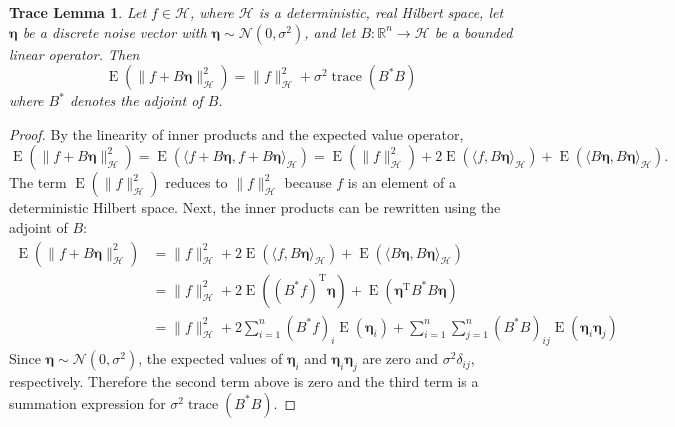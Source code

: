 \documentclass[12pt]{article}
\newcommand{\trans}{\mathrm{T}}	%
\newcommand{\trace}{\operatorname{trace}}	%
\newcommand{\noiseSD}{\sigma}	%
\newcommand{\noise}{\bm{\eta}}	%
\newcommand{\E}{\operatorname{E}}	%
\newtheorem*{TL}{Trace Lemma}
\begin{document}
\begin{TL}
Let $f \in \mathcal{H}$, where $\mathcal{H}$ is a deterministic, real Hilbert space, let $\noise$ be a discrete noise vector with $\noise \sim \mathcal{N}(0,\noiseSD^2)$, and let $B: \mathbb{R}^n \rightarrow \mathcal{H}$ be a bounded linear operator. Then
\[\E(\|f + B\noise\|_{\mathcal{H}}^2) = \|f\|_{\mathcal{H}}^2 + \noiseSD^2\trace({B^*}B)\]
where $B^*$ denotes the adjoint of $B$.
\end{TL}
\begin{proof}
By the linearity of inner products and the expected value operator,
\[\E(\|f + B\noise\|_{\mathcal{H}}^2) = \E(\langle f + B\noise, f + B\noise\rangle_{\mathcal{H}}) = \E(\|f\|_{\mathcal{H}}^2) + 2\E(\langle f, B\noise\rangle_{\mathcal{H}}) + \E(\langle B\noise, B\noise\rangle_{\mathcal{H}}).\]
The term $\E(\|f\|_{\mathcal{H}}^2)$ reduces to $\|f\|_{\mathcal{H}}^2$ because $f$ is an element of a deterministic Hilbert space. Next, the inner products can be rewritten using the adjoint of $B$:
\begin{align*}
\E(\|f + B\noise\|_{\mathcal{H}}^2) &= \|f\|_{\mathcal{H}}^2 + 2\E(\langle f, B\noise\rangle_{\mathcal{H}}) + \E(\langle B\noise, B\noise\rangle_{\mathcal{H}}) \\
&= \|f\|_{\mathcal{H}}^2 + 2\E(({B^*}f)^\trans\noise) + \E({\noise^\trans}{B^*}B\noise) \\
&= \|f\|_{\mathcal{H}}^2 + 2\sum_{i=1}^n ({B^*}f)_i \E(\noise_i) + \sum_{i=1}^n\sum_{j=1}^n ({B^*}B)_{ij} \E({\noise_i}{\noise_j})
\end{align*}
Since $\noise \sim \mathcal{N}(0,\noiseSD^2)$, the expected values of $\noise_i$ and ${\noise_i}{\noise_j}$ are zero and $\noiseSD^2\delta_{ij}$, respectively. Therefore the second term above is zero and the third term is a summation expression for $\noiseSD^2\trace({B^*}B)$.
\end{proof}
\end{document}
